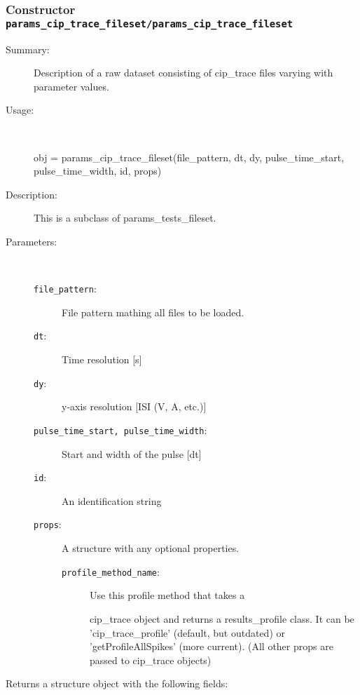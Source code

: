 \subsubsection[Constructor \texttt{params\_cip\_trace\_fileset}]{Constructor \texttt{params\_cip\_trace\_fileset/params\_cip\_trace\_fileset}}%
%
\label{ref_params_cip_trace_fileset__params_cip_trace_fileset}%
\hypertarget{ref_params_cip_trace_fileset__params_cip_trace_fileset}{}%
\begin{description}
\item[Summary:]Description of a raw dataset consisting of cip\_trace files varying 
	with parameter values.
%
\item[Usage:]~%
\begin{lyxcode}%
obj = params\_cip\_trace\_fileset(file\_pattern, dt, dy, 
				 pulse\_time\_start, pulse\_time\_width, id, props)
%
\end{lyxcode}%
%
\item[Description:]%
This is a subclass of params\_tests\_fileset.
\item[Parameters:]~
\begin{description}%
\item[\texttt{file\_pattern}:]
 File pattern mathing all files to be loaded.
\item[\texttt{dt}:]
 Time resolution [s]
\item[\texttt{dy}:]
 y-axis resolution [ISI (V, A, etc.)]
\item[\texttt{pulse\_time\_start, pulse\_time\_width}:]


Start and width of the pulse [dt]
\item[\texttt{id}:]
 An identification string
\item[\texttt{props}:]
 A structure with any optional properties.
\begin{description}%
\item[\texttt{profile\_method\_name}:]
 Use this profile method that takes a

cip\_trace object and returns a results\_profile class. It
can be 'cip\_trace\_profile' (default, but outdated) or
'getProfileAllSpikes' (more current).
(All other props are passed to cip\_trace objects)
\end{description}%
\end{description}%
%
\item[Returns a structure object with the following fields:
]~


\end{description}
